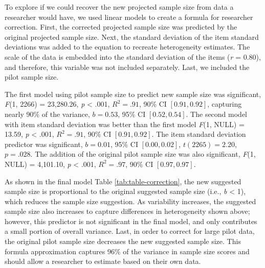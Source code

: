 \documentclass[
  man]{apa6}
\begin{document}
To explore if we could recover the new projected sample size from data a researcher would have, we used linear models to create a formula for researcher correction. First, the corrected projected sample size was predicted by the original projected sample size. Next, the standard deviation of the item standard deviations was added to the equation to recreate heterogeneity estimates. The scale of the data is embedded into the standard deviation of the items (\emph{r} = 0.80), and therefore, this variable was not included separately. Last, we included the pilot sample size.

The first model using pilot sample size to predict new sample size was significant, \emph{F}(1, 2266) = 23,280.26, \emph{p} \textless{} .001, \(R^2 = .91\), 90\% CI \([0.91, 0.92]\), capturing nearly 90\% of the variance, \(b = 0.53\), 95\% CI \([0.52, 0.54]\). The second model with item standard deviation was better than the first model \emph{F}(1, NULL) = 13.59, \emph{p} \textless{} .001, \(R^2 = .91\), 90\% CI \([0.91, 0.92]\). The item standard deviation predictor was significant, \(b = 0.01\), 95\% CI \([0.00, 0.02]\), \(t(2265) = 2.20\), \(p = .028\). The addition of the original pilot sample size was also significant, \emph{F}(1, NULL) = 4,101.10, \emph{p} \textless{} .001, \(R^2 = .97\), 90\% CI \([0.97, 0.97]\).

As shown in the final model Table \ref{tab:table-correction}, the new suggested sample size is proportional to the original suggested sample size (i.e., \emph{b} \textless{} 1), which reduces the sample size suggestion. As variability increases, the suggested sample size also increases to capture differences in heterogeneity shown above; however, this predictor is not significant in the final model, and only contributes a small portion of overall variance. Last, in order to correct for large pilot data, the original pilot sample size decreases the new suggested sample size. This formula approximation captures 96\% of the variance in sample size scores and should allow a researcher to estimate based on their own data.
\end{document}
